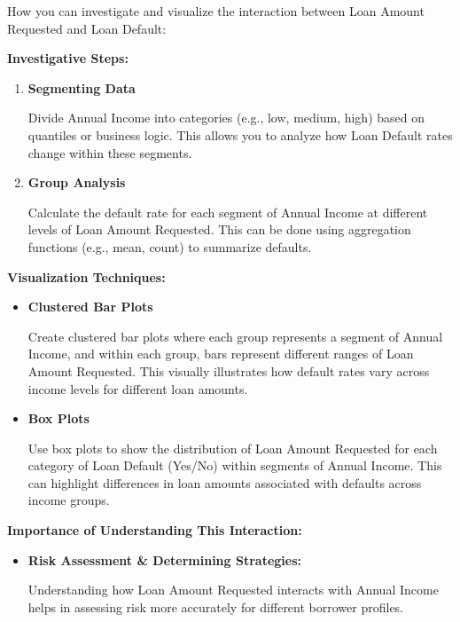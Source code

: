 \documentclass[12pt]{article}
\begin{document}
\begin{itemize}
			How you can investigate and visualize the interaction between Loan Amount Requested and Loan Default:
			
			\textbf{Investigative Steps:}
			\begin{enumerate}
	
				\item{\textbf{Segmenting Data}}
			
				Divide Annual Income into categories (e.g., low, medium, high) based on quantiles or business logic. This allows you to analyze how Loan Default rates change within these segments.
			
				\item{\textbf{Group Analysis}}
				
				Calculate the default rate for each segment of Annual Income at different levels of Loan Amount Requested. This can be done using aggregation functions (e.g., mean, count) to summarize defaults.
				
			\end{enumerate}
			
			\textbf{Visualization Techniques:}
			\begin{itemize}
	
				\item{\textbf{Clustered Bar Plots}}
				
				Create clustered bar plots where each group represents a segment of Annual Income, and within each group, bars represent different ranges of Loan Amount Requested. This visually illustrates how default rates vary across income levels for different loan amounts.
				
				\item{\textbf{Box Plots}}
				
				Use box plots to show the distribution of Loan Amount Requested for each category of Loan Default (Yes/No) within segments of Annual Income. This can highlight differences in loan amounts associated with defaults across income groups.
				
			\end{itemize}			

			\textbf{Importance of Understanding This Interaction:}
			\begin{itemize}
	
				\item{\textbf{Risk Assessment \& Determining Strategies:}}
				
				Understanding how Loan Amount Requested interacts with Annual Income helps in assessing risk more accurately for different borrower profiles.
			

\end{itemize}
\end{itemize}
\end{document}
